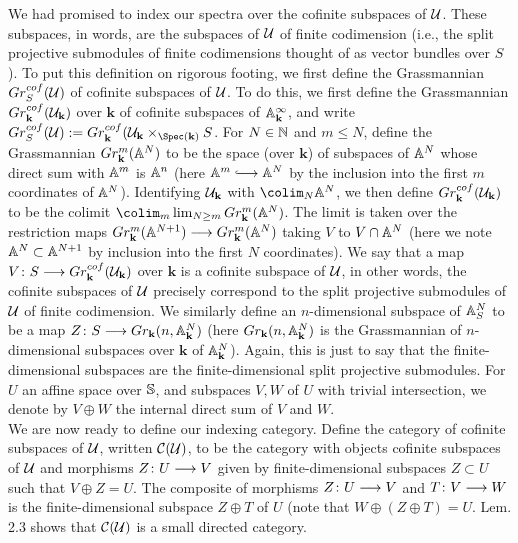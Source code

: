 \documentclass{amsart}
\theoremstyle{definition}
\newcommand{\bk}{\mathbf{k}}
\begin{document}
We had promised to index our spectra over the cofinite subspaces of ${\mathcal{U}}$. These subspaces, in words, are the subspaces of ${\mathcal{U}}$ of finite codimension (i.e., the split projective submodules of finite codimensions thought of as vector bundles over $S$). To put this definition on rigorous footing, we first define the Grassmannian $Gr_{S}^{cof}({\mathcal{U}})$ of cofinite subspaces of ${\mathcal{U}}$. To do this, we first define the Grassmannian $Gr_{\bk}^{cof}(\oU_{\bk})$ over $\bk$ of cofinite subspaces of $\bA^{\infty}_{\bk}$, and write $Gr_{S}^{cof}(\oU) := Gr_{\bk}^{cof}(\oU_{\bk} \times_{\Spec(\bk)} S$. For $N \in \mathbb{N}$ and $m \leq N$, define the Grassmannian $Gr_{\bk}^{m}(\bA^N)$ to be the space (over $\bk$) of subspaces of $\mathbb{A}^N$ whose direct sum with $\mathbb{A}^m$ is $\mathbb{A}^n$ (here $\bA^m \monoto \bA^N$ by the inclusion into the first $m$ coordinates of $\mathbb{A}^N$). Identifying $\oU_{\bk}$ with $\colim_N \bA^N$, we then define $Gr_{\bk}^{cof}(\oU_{\bk})$ to be the colimit $\colim_m \lim_{N \geq m} Gr_{\bk}^m(\bA^N)$. The limit is taken over the restriction maps $Gr_{\bk}^{m}(\bA^{N+1}) \rtarr Gr_{\bk}^m (\bA^N)$ taking $V$ to $V \cap \mathbb{A}^N$ (here we note $\mathbb{A}^N \subset \mathbb{A}^{N+1}$ by inclusion into the first $N$ coordinates). We say that a map $V \colon S \rtarr Gr^{cof}_{\bk}(\oU_{\bk})$ over $\bk$ is a cofinite subspace of ${\mathcal{U}}$, in other words, the cofinite subspaces of ${\mathcal{U}}$ precisely correspond to the split projective submodules of ${\mathcal{U}}$ of finite codimension. We similarly define an $n$-dimensional subspace of $\mathbb{A}^N_S$ to be a map $Z \colon S \rtarr Gr_{\bk}(n,\bA^N_{\bk})$ (here $Gr_{\bk}(n,\bA^N_{\bk})$ is the Grassmannian of $n$-dimensional subspaces over $\bk$ of $\bA^N_{\bk}$). Again, this is just to say that the finite-dimensional subspaces are the finite-dimensional split projective submodules. For $U$ an affine space over $\mathbb{S}$, and subspaces $V, W$ of $U$ with trivial intersection, we denote by $V \oplus W$ the internal direct sum of $V$ and $W$.\\

We are now ready to define our indexing category. Define the category of cofinite subspaces of ${\mathcal{U}}$, written ${\mathcal{C}}({\mathcal{U}})$, to be the category with objects cofinite subspaces of ${\mathcal{U}}$ and morphisms $Z \colon U \longrightarrow V$ given by finite-dimensional subspaces $Z \subset U$ such that $V \oplus Z  = U$. The composite of morphisms $Z \colon U \longrightarrow V$ and $T \colon V \longrightarrow W$ is the finite-dimensional subspace $Z \oplus T$ of $U$ (note that $W \oplus (Z \oplus T) = U$. \cite{Hu03} Lem. 2.3 shows that ${\mathcal{C}}({\mathcal{U}})$ is a small directed category.\\
\end{document}
